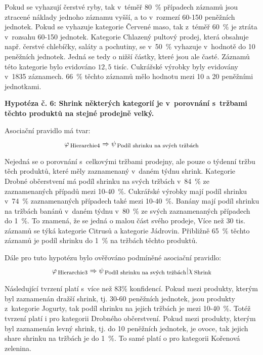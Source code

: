 Pokud se vyhazují čerstvé ryby, tak v~téměř 80~\% případech záznamů jsou ztracené náklady jednoho záznamu vyšší, a to v~rozmezí 60-150 peněžních jednotek.
Pokud se vyhazuje kategorie Červené maso, tak z~téměř 60~\% je ztráta v~rozsahu 60-150 jednotek.
Kategorie Chlazený pultový prodej, která obsahuje např. čerstvé chlebíčky, saláty a pochutiny, se v~50~\% vyhazuje v~hodnotě do 10 peněžních jednotek. Jedná se tedy o nižší částky, které jsou ale časté. Záznamů této kategorie bylo evidováno $12{,}5$ tisíc.
Cukrářské výrobky byly evidovány v~1835 záznamech. 66~\% těchto záznamů mělo hodnotu mezi 10 a 20 peněžními jednotkami.

\vspace*{1em}

\textbf{Hypotéza č. 6: Shrink některých kategorií je v~porovnání s~tržbami těchto produktů na stejné prodejně velký.}

Asociační pravidlo má tvar:
\begin{equation}
    \varphi_{\mbox{\,\footnotesize Hierarchie4}} \Rightarrow \psi_{\mbox{\,\footnotesize Podíl shrinku na svých tržbách}}
\end{equation}

Nejedná se o porovnání s~celkovými tržbami prodejny, ale pouze o týdenní tržbu těch produktů, které měly zaznamenaný v~daném týdnu shrink.
Kategorie Drobné občerstvení má podíl shrinku na svých tržbách v~84~\% ze zaznamenaných případů mezi 10-40~\%.
Cukrářské výrobky  mají podíl shrinku v~74~\% zaznamenaných případech také mezi 10-40~\%.
Banány mají podíl shrinku na tržbách banánů v~daném týdnu v~80~\% ze svých zaznamenaných případech do 1~\%. To znamená, že se jedná o malou část svého prodeje,
Více než 30 tis. záznamů se týká kategorie Citrusů a kategorie Jádrovin. Přibližně 65~\% těchto záznamů je podíl shrinku do 1~\% na tržbách těchto produktů.

Dále pro tuto hypotézu bylo ověřováno podmíněné asociační pravidlo:
\begin{equation}
    \varphi_{\mbox{\,\footnotesize Hierarchie3}} \Rightarrow \psi_{\mbox{\,\footnotesize Podíl shrinku na svých tržbách}} | \chi_{\mbox{\,\footnotesize Shrink}}
\end{equation} 

Následující tvrzení platí s~více než 83\% konfidencí.
Pokud mezi produkty, kterým byl zaznamenán dražší shrink, tj. 30-60 peněžních jednotek, jsou produkty z~kategorie Jogurty, tak podíl shrinku na jejich tržbách je mezi 10-40~\%. Totéž tvrzení platí i pro kategorii Drobného občerstvení.
Pokud mezi produkty, kterým byl zaznamenán levný shrink, tj. do 10 peněžních jednotek, je ovoce, tak jejich share shrinku na tržbách je do 1~\%. To samé platí o pro kategorii Kořenová zelenina.

